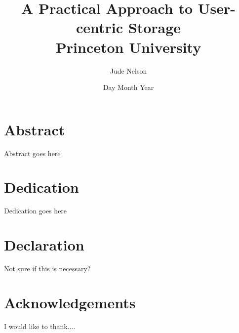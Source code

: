 \documentclass[12pt]{report}
\title{
	{A Practical Approach to User-centric Storage}\\
	{\large Princeton University}\\
}
\author{Jude Nelson}
\date{Day Month Year}
\begin{document}
\maketitle

\chapter*{Abstract}

Abstract goes here

\chapter*{Dedication}

Dedication goes here

\chapter*{Declaration}

Not sure if this is necessary?

\chapter*{Acknowledgements}

I would like to thank....

\tableofcontents










 
\end{document}
